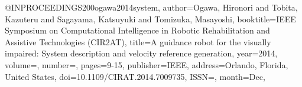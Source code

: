 @INPROCEEDINGS{200ogawa2014system,
author={Ogawa, Hironori and Tobita, Kazuteru and Sagayama, Katsuyuki and Tomizuka, Masayoshi},
booktitle={IEEE Symposium on Computational Intelligence in Robotic Rehabilitation and Assistive Technologies (CIR2AT)}, 
title={A guidance robot for the visually impaired: System description and velocity reference generation}, 
year={2014},
volume={},
number={},
pages={9-15},
publisher={IEEE},
address={Orlando, Florida, United States},
doi={10.1109/CIRAT.2014.7009735},
ISSN={},
month={Dec},}